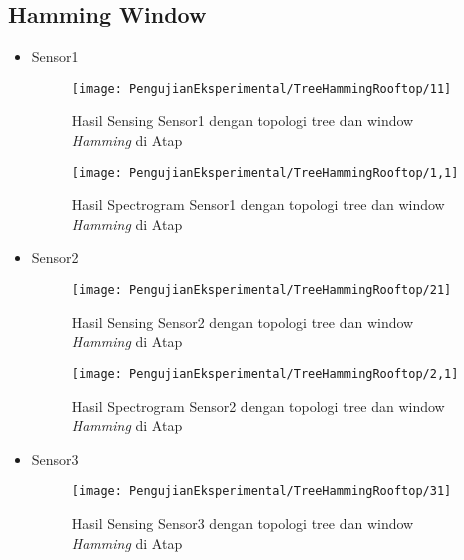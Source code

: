 \subsection{Hamming Window}
\begin{itemize}
\item Sensor1
\begin{figure}[H]
	\centering
	\texttt{[image: PengujianEksperimental/TreeHammingRooftop/11]}
	\caption[Hasil Sensing Sensor1 dengan topologi tree dan window {\it Hamming} di Atap]{Hasil Sensing Sensor1 dengan topologi tree dan window {\it Hamming} di Atap} 
	\label{fig:hasilAtapTreeHamm11}
\end{figure}

\begin{figure}[H]
	\centering
	\texttt{[image: PengujianEksperimental/TreeHammingRooftop/1,1]}
	\caption[Hasil Spectrogram Sensor1 dengan topologi tree dan window {\it Hamming} di Atap]{Hasil Spectrogram Sensor1 dengan topologi tree dan window {\it Hamming} di Atap} 
	\label{fig:hasilAtapTreeHamm1,1}
\end{figure}

\item Sensor2
\begin{figure}[H]
	\centering
	\texttt{[image: PengujianEksperimental/TreeHammingRooftop/21]}
	\caption[Hasil Sensing Sensor2 dengan topologi tree dan window {\it Hamming} di Atap]{Hasil Sensing Sensor2 dengan topologi tree dan window {\it Hamming} di Atap} 
	\label{fig:hasilAtapTreeHamm21}
\end{figure}

\begin{figure}[H]
	\centering
	\texttt{[image: PengujianEksperimental/TreeHammingRooftop/2,1]}
	\caption[Hasil Spectrogram Sensor2 dengan topologi tree dan window {\it Hamming} di Atap]{Hasil Spectrogram Sensor2 dengan topologi tree dan window {\it Hamming} di Atap} 
	\label{fig:hasilAtapTreeHamm2,1}
\end{figure}

\item Sensor3
\begin{figure}[H]
	\centering
	\texttt{[image: PengujianEksperimental/TreeHammingRooftop/31]}
	\caption[Hasil Sensing Sensor3 dengan topologi tree dan window {\it Hamming} di Atap]{Hasil Sensing Sensor3 dengan topologi tree dan window {\it Hamming} di Atap} 
	\label{fig:hasilAtapTreeHamm31}
\end{figure}


\end{itemize}
